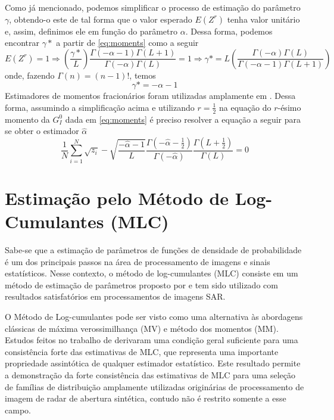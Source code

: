 \documentclass[12pt]{article}
\begin{document}
Como já mencionado, podemos simplificar o processo de estimação do parâmetro $\gamma$, obtendo-o este de tal forma que o valor esperado $E(Z^r)$ tenha valor unitário e, assim, definimos ele em função do parâmetro $\alpha$. Dessa forma, podemos encontrar $\gamma*$ a partir de \eqref{eq:moments} como a seguir
\begin{equation}
    E(Z^r) = 1 \Rightarrow \left (\frac{\gamma*}{L}\right ) \frac{\Gamma(-\alpha-1)\Gamma(L+1)}{\Gamma(-\alpha)\Gamma(L)} = 1 \Rightarrow \gamma* = L\left ( \frac{\Gamma(-\alpha)\Gamma(L)}{\Gamma(-\alpha-1)\Gamma(L+1)} \right ) 
\end{equation}
onde, fazendo $\Gamma(n) = (n-1)!$, temos
\begin{equation}
    \gamma* = -\alpha - 1
\end{equation}
Estimadores de momentos fracionários foram utilizadas amplamente em \citet{Clutter1997}. Dessa forma, assumindo a simplificação acima e utilizando $r=\frac{1}{2}$ na equação do $r$-ésimo momento da $G_I^0$ dada em \eqref{eq:moments} é preciso resolver a equação a seguir para se obter o estimador $\widehat{\alpha}$
\begin{equation}
    \frac{1}{N}\sum_{i=1}^{N}\sqrt{z_i}-\sqrt{\frac{-\widehat{\alpha} - 1}{L}}\frac{\Gamma(-\widehat{\alpha} - \frac{1}{2})}{\Gamma(-\widehat{\alpha})}\frac{\Gamma(L+\frac{1}{2})}{\Gamma(L)} = 0 \label{fractional_moments}
\end{equation}

\section{Estimação pelo Método de Log-Cumulantes (MLC)}

Sabe-se que a estimação de parâmetros de funções de densidade de probabilidade é um dos principais passos na área de processamento de imagens e sinais estatísticos. Nesse contexto, o método de log-cumulantes (MLC) consiste em um método de estimação de parâmetros proposto por \citet{nicolas2002} e tem sido utilizado com resultados satisfatórios em processamentos de imagens SAR.

O Método de Log-cumulantes pode ser visto como uma alternativa às abordagens clássicas de máxima verossimilhança (MV) e método dos momentos (MM). Estudos feitos no trabalho de \citet{krylov2013} derivaram uma condição geral suficiente para uma consistência forte das estimativas de MLC, que representa uma importante propriedade assintótica de qualquer estimador estatístico. Este resultado permite a demonstração da forte consistência das estimativas de MLC para uma seleção de famílias de distribuição amplamente utilizadas originárias de processamento de imagem de radar de abertura sintética, contudo não é restrito somente a esse campo. 
\end{document}
